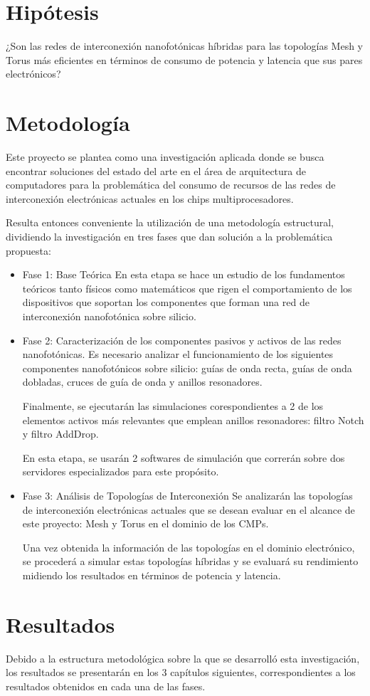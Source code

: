 \section{Hipótesis}
¿Son las redes de interconexión nanofotónicas híbridas para las
topologías Mesh y Torus más eficientes en términos de consumo de potencia
 y latencia que sus pares electrónicos?

\section{Metodología}
Este proyecto se plantea como una investigación aplicada donde se busca 
encontrar soluciones del estado del arte en el área de arquitectura de 
computadores para la problemática del consumo de recursos de las redes de 
interconexión electrónicas actuales en los chips multiprocesadores. 

Resulta entonces conveniente la utilización de una metodología estructural, 
dividiendo la investigación en tres fases que dan solución a la 
problemática propuesta:

\begin{itemize}
\item Fase 1: Base Teórica
En esta etapa se hace un estudio de los fundamentos teóricos tanto físicos
como matemáticos que rigen el comportamiento de los dispositivos que soportan
los componentes que forman una red de interconexión nanofotónica sobre silicio. 

\item Fase 2: Caracterización de los componentes pasivos y activos de las redes nanofotónicas. 
Es necesario analizar el funcionamiento de los siguientes componentes 
nanofotónicos sobre silicio: guías de onda recta, guías de onda dobladas, cruces de guía de onda 
y anillos resonadores.

Finalmente, se ejecutarán las simulaciones corespondientes a 
2 de los elementos activos más relevantes que
emplean anillos resonadores: filtro Notch y filtro AddDrop.

En esta etapa, se usarán 2 softwares de simulación que correrán 
sobre dos servidores especializados para este propósito. 

\item Fase 3: Análisis de Topologías de Interconexión
Se analizarán las topologías de interconexión electrónicas 
actuales que se desean evaluar en el alcance de este proyecto: Mesh y Torus 
en el dominio de los CMPs.

Una vez obtenida la información de las topologías en el dominio electrónico, 
se procederá a simular estas topologías híbridas y se evaluará su rendimiento
midiendo los resultados en términos de potencia y latencia.

\end{itemize} 

\section{Resultados}

Debido a la estructura metodológica sobre la que se desarrolló esta investigación,
los resultados se presentarán en los 3 capítulos siguientes, correspondientes a 
los resultados obtenidos en cada una de las fases.
